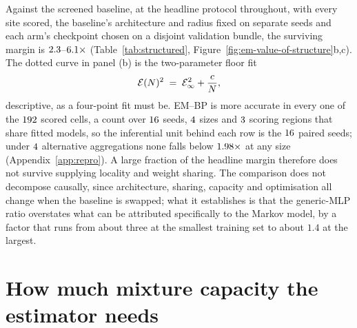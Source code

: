Against the screened baseline, at the headline protocol throughout, with
every site scored, the baseline's architecture and radius fixed on separate
seeds and each arm's checkpoint chosen on a disjoint validation bundle, the
surviving margin is $2.3$--$6.1\times$
(Table~\ref{tab:structured}, Figure~\ref{fig:em-value-of-structure}b,c). The
dotted curve in panel (b) is the two-parameter floor fit
\begin{equation}
  \mathcal{E}(N)^2 \;=\; \mathcal{E}_{\infty}^2 + \frac{c}{N},
  \label{eq:em-floor}
\end{equation}
descriptive, as a four-point fit must be. EM--BP is more accurate in every
one of the $192$ scored cells, a count over $16$ seeds,
$4$ sizes and $3$ scoring regions that share fitted
models, so the inferential unit behind each row is the $16$ paired
seeds; under $4$ alternative aggregations none falls below
$1.98\times$ at any size (Appendix~\ref{app:repro}). A large
fraction of the headline margin therefore does not survive supplying locality
and weight sharing. The comparison does not decompose causally, since
architecture, sharing, capacity and optimisation all change when the baseline
is swapped; what it establishes is that the generic-MLP ratio overstates what
can be attributed specifically to the Markov model, by a factor that runs from
about three at the smallest training set to about $1.4$ at the largest.



\section{How much mixture capacity the estimator needs}\label{sec:em-capacity}

